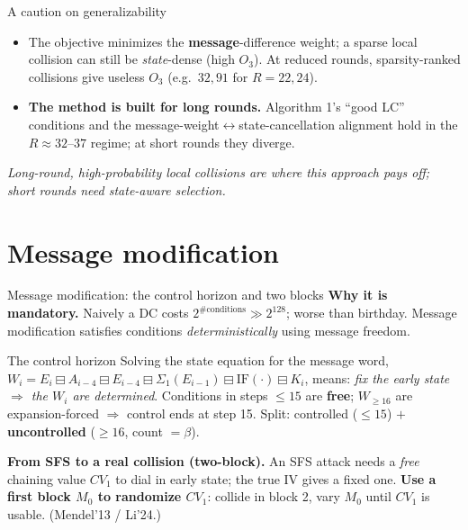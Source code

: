 \documentclass[aspectratio=169,9pt]{beamer}
\newcommand{\bsub}{\boxminus}
\newcommand{\key}[1]{\textcolor{key}{\textbf{#1}}}
\begin{document}
\begin{frame}{A caution on generalizability}
\begin{itemize}
  \item The objective minimizes the \key{message}-difference weight; a sparse local collision can still be \emph{state}-dense (high $O_3$). At reduced rounds, sparsity-ranked collisions give useless $O_3$ (e.g.\ $32,91$ for $R=22,24$).

  \item \key{The method is built for long rounds.} Algorithm 1's ``good LC'' conditions and the message-weight$\leftrightarrow$state-cancellation alignment hold in the $R\approx 32$--$37$ regime; at short rounds they diverge.
\end{itemize}
\centering\emph{Long-round, high-probability local collisions are where this approach pays off; short rounds need state-aware selection.}
\end{frame}

\section{Message modification}

\begin{frame}{Message modification: the control horizon and two blocks}
\textbf{Why it is mandatory.} Naively a DC costs $2^{\#\text{conditions}}\gg 2^{128}$; worse than birthday. Message modification satisfies conditions \emph{deterministically} using message freedom.
\begin{block}{The control horizon}
\small Solving the state equation for the message word, $W_i = E_i\bsub A_{i-4}\bsub E_{i-4}\bsub\Sigma_1(E_{i-1})\bsub\mathrm{IF}(\cdot)\bsub K_i$, means: \emph{fix the early state $\Rightarrow$ the $W_i$ are determined}. Conditions in steps $\le 15$ are \key{free}; $W_{\ge 16}$ are expansion-forced $\Rightarrow$ control ends at step 15. Split: controlled ($\le 15$) $+$ \key{uncontrolled} ($\ge 16$, count $=\beta$).
\end{block}
\textbf{From SFS to a real collision (two-block).} An SFS attack needs a \emph{free} chaining value $CV_1$ to dial in early state; the true IV gives a fixed one. \key{Use a first block $M_0$ to randomize $CV_1$}: collide in block 2, vary $M_0$ until $CV_1$ is usable. (Mendel'13 / Li'24.)
\end{frame}
\end{document}
